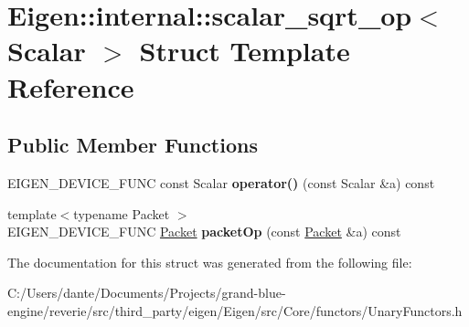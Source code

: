\hypertarget{struct_eigen_1_1internal_1_1scalar__sqrt__op}{}\section{Eigen\+::internal\+::scalar\+\_\+sqrt\+\_\+op$<$ Scalar $>$ Struct Template Reference}
\label{struct_eigen_1_1internal_1_1scalar__sqrt__op}
\subsection*{Public Member Functions}
\begin{DoxyCompactItemize}
\item 
\mbox{\label{struct_eigen_1_1internal_1_1scalar__sqrt__op_a6292a98edf3322b52f80a4c376773a92}} 
E\+I\+G\+E\+N\+\_\+\+D\+E\+V\+I\+C\+E\+\_\+\+F\+U\+NC const Scalar {\bfseries operator()} (const Scalar \&a) const
\item 
\mbox{\label{struct_eigen_1_1internal_1_1scalar__sqrt__op_ac83e66625cb0ed4e8aefe65ad055936b}} 
{\footnotesize template$<$typename Packet $>$ }\\E\+I\+G\+E\+N\+\_\+\+D\+E\+V\+I\+C\+E\+\_\+\+F\+U\+NC \mbox{\hyperlink{union_eigen_1_1internal_1_1_packet}{Packet}} {\bfseries packet\+Op} (const \mbox{\hyperlink{union_eigen_1_1internal_1_1_packet}{Packet}} \&a) const
\end{DoxyCompactItemize}


The documentation for this struct was generated from the following file\+:\begin{DoxyCompactItemize}
\item 
C\+:/\+Users/dante/\+Documents/\+Projects/grand-\/blue-\/engine/reverie/src/third\+\_\+party/eigen/\+Eigen/src/\+Core/functors/Unary\+Functors.\+h\end{DoxyCompactItemize}
